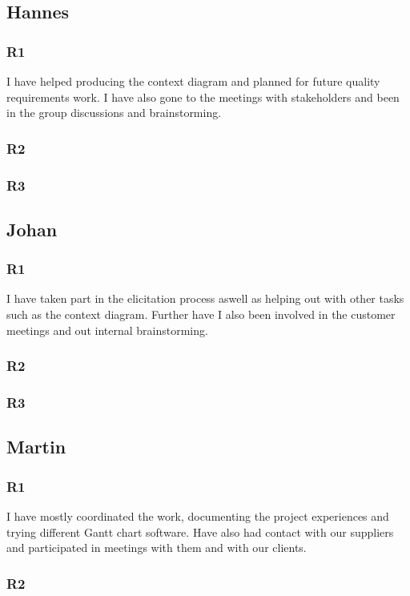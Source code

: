 \documentclass[a4paper]{article}
\begin{document}
  \subsection{Hannes}
    \subsubsection{R1}
    I have helped producing the context diagram and planned for future quality requirements work. I have also gone to the meetings with stakeholders and been in the group discussions and brainstorming.
    \subsubsection{R2}
    \subsubsection{R3}
  
  \subsection{Johan}
    \subsubsection{R1}
    I have taken part in the elicitation process aswell as helping out with other tasks such as the context diagram. Further have I also been involved in the customer meetings and out internal brainstorming.
    \subsubsection{R2}
    \subsubsection{R3}
  
  \subsection{Martin}
    \subsubsection{R1}
    I have mostly coordinated the work, documenting the project experiences and trying different Gantt chart software. Have also had contact with our suppliers and participated in meetings with them and with our clients.
    \subsubsection{R2}
\end{document}
